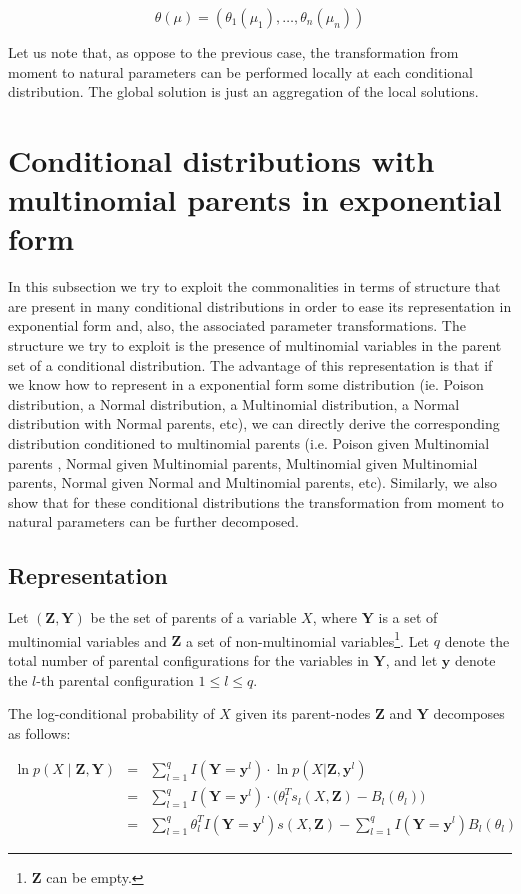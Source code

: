\documentclass[11pt, oneside]{article}   	%
\newcommand{\bm}{\mathbf}
\numberwithin{figure}{section}
\numberwithin{equation}{section}
\numberwithin{table}{section}
\theoremstyle{definition}
\begin{document}
$$ \theta(\mu) = (\theta_1(\mu_1), \ldots, \theta_n(\mu_n))$$

Let us note that, as oppose to the previous case, the transformation from moment to natural parameters can be performed locally at each conditional distribution. The global solution is just an aggregation of the local solutions.

\section{Conditional distributions with multinomial parents in exponential form}
\label{Section:CD_With_MParents}

In this subsection we try to exploit the commonalities in terms of structure that are present in many conditional distributions in order to ease its representation in exponential form and, also, the associated parameter transformations.  The structure we try to exploit is the presence of multinomial variables in the parent set of a conditional distribution. The advantage of this representation is that if we know how to represent in a exponential form some distribution (ie. Poison distribution, a Normal distribution, a Multinomial distribution, a Normal distribution with Normal parents, etc), we can directly derive the corresponding distribution conditioned to multinomial parents (i.e. Poison given Multinomial parents , Normal given Multinomial parents, Multinomial given Multinomial parents, Normal given Normal and Multinomial parents, etc). Similarly, we  also show that for these conditional distributions the transformation from moment to natural parameters can be further decomposed. 


\subsection{Representation}
\label{Section:CD_With_MParents:Representation}

Let $(\bm Z, \bm Y)$ be the set of parents of a variable $X$, where $\mathbf{Y}$ is a set of multinomial variables and $\bm Z$ a set of non-multinomial variables\footnote{$\bm Z$ can be empty.}.  Let $q$ denote the total number of parental configurations for the variables in $\bm Y$, and let $\bm y$ denote the $l$-th parental configuration $1 \leq l \leq q$.

The log-conditional probability of $X$ given its parent-nodes $\bm Z$ and $\mathbf{Y}$ decomposes as  follows:

\begin{eqnarray*}
\ln p(X \mid \bm Z, \bm Y) &=&  \sum_{l=1}^q I(\mathbf{Y} =\mathbf{y}^l) \cdot \ln p(X | \bm Z, \mathbf{y}^l) \\
&=& \sum_{l=1}^q I(\mathbf{Y} =\mathbf{y}^l) \cdot \Big(  \theta_{l}^T s_l(X, \bm Z)  -  B_l(\theta_{l}) \Big)\\
&=& \sum_{l=1}^q \theta_{l}^T  I(\mathbf{Y} =\mathbf{y}^l) s(X, \bm Z) - \sum_{l=1}^q I(\mathbf{Y} =\mathbf{y}^l) B_l(\theta_{l})
\end{eqnarray*}
\end{document}
